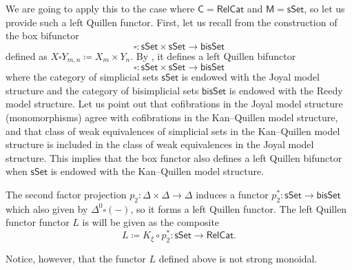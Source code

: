 \documentclass{proc-l}
\theoremstyle{plain}
\theoremstyle{definition}
\theoremstyle{remark}
\begin{document}
We are going to apply this to the case where $\mathsf{C}= \mathsf{RelCat}$ and $\mathsf{M}=\mathsf{sSet}$, so let us provide such a left Quillen functor. First, let us recall from \cite{JoaylTierney07} the construction of the box bifunctor
\[
\square: \mathsf{sSet} \times \mathsf{sSet} \longrightarrow \mathsf{bisSet}
\]
defined as $X \square Y_{m,n} \coloneqq X_m\times Y_n$. By \cite[Proposition 4.6]{JoaylTierney07}, it defines a left Quillen bifunctor
\[
\square :  \mathsf{sSet} \times  \mathsf{sSet} \rightarrow \mathsf{bisSet}
\]
where the category of simplicial sets $\mathsf{sSet}$ is endowed with the Joyal model structure and the category of bisimplicial sets $\mathsf{bisSet}$ is endowed with the Reedy model structure. Let us
point out that cofibrations in the Joyal model structure (monomorphisms) agree with cofibrations in the Kan--Quillen model structure, and that class of weak equivalences of simplicial sets in the Kan--Quillen model structure is included in the class of weak equivalences in the Joyal model structure. This implies that the box functor also defines a left Quillen bifunctor when $\mathsf{sSet}$ is endowed with the Kan--Quillen model structure.

The second factor projection $p_2:\Delta\times\Delta \longrightarrow\Delta$ induces a functor $p_2^*:\mathsf{sSet} \rightarrow \mathsf{bisSet}$ which also given by $\Delta^0 \square (-)$, so it forms a left Quillen functor. The left Quillen functor functor $L$ is will be given as the composite
\[
L \coloneqq K_{\xi} \circ p_2^*: \mathsf{sSet}\rightarrow \mathsf{RelCat}.
\]

Notice, however, that the functor $L$ defined above is not strong monoidal.
\end{document}

